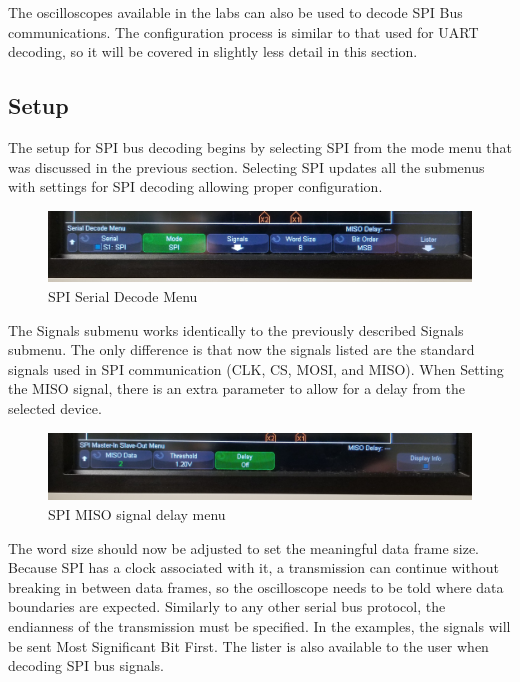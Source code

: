 \documentclass{article}
\begin{document}
  The oscilloscopes available in the labs can also be used to decode SPI Bus
  communications. The configuration process is similar to that used for UART
  decoding, so it will be covered in slightly less detail in this section.

  \subsection{Setup}

  The setup for SPI bus decoding begins by selecting SPI from the mode menu that
  was discussed in the previous section. Selecting SPI updates all the submenus
  with settings for SPI decoding allowing proper configuration.

  \begin{figure}[h]
    \includegraphics[width=\textwidth]{images/spi/spi_serial_menu.jpg}
    \caption{SPI Serial Decode Menu}
  \end{figure}

  The Signals submenu works identically to the previously described Signals
  submenu. The only difference is that now the signals listed are the standard
  signals used in SPI communication (CLK, CS, MOSI, and MISO). When Setting the
  MISO signal, there is an extra parameter to allow for a delay from the
  selected device.

  \begin{figure}[h]
    \includegraphics[width=\textwidth]{images/spi/spi_slave_delay.jpg}
    \caption{SPI MISO signal delay menu}
  \end{figure}

  The word size should now be adjusted to set the meaningful data frame size.
  Because SPI has a clock associated with it, a transmission can continue
  without breaking in between data frames, so the oscilloscope needs to be told
  where data boundaries are expected.
  Similarly to any other serial bus protocol, the endianness of the transmission
  must be specified. In the examples, the signals will be sent Most Significant
  Bit First.
  The lister is also available to the user when decoding SPI bus signals.
\end{document}

